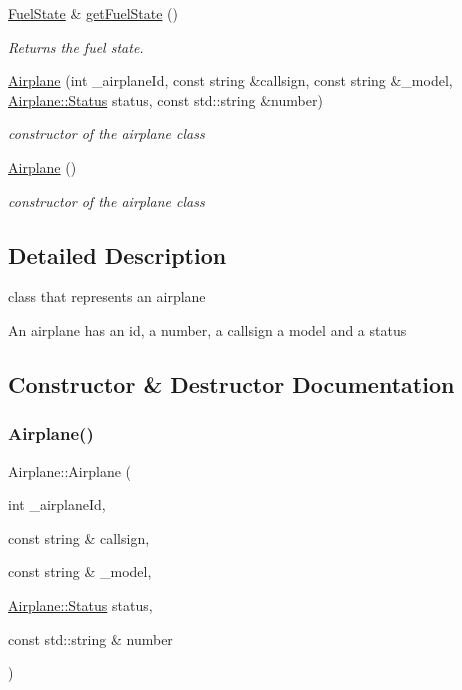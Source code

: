 \begin{DoxyCompactItemize}
\mbox{\hyperlink{class_airplane_ad17ce69f4dd39704789158c726f5bf45}{Fuel\+State}} \& \mbox{\hyperlink{class_airplane_a66070ab8430583b6abacec0bfe82a830}{get\+Fuel\+State}} ()
\begin{DoxyCompactList}\small\item\em Returns the fuel state. \end{DoxyCompactList}\item 
\mbox{\hyperlink{class_airplane_ad8ed968b4c3952fd8849414af207f45f}{Airplane}} (int \+\_\+airplane\+Id, const string \&callsign, const string \&\+\_\+model, \mbox{\hyperlink{class_airplane_a2fe18f372ef9acb9d557998a560ad66e}{Airplane\+::\+Status}} status, const std\+::string \&number)
\begin{DoxyCompactList}\small\item\em constructor of the airplane class \end{DoxyCompactList}\item 
\mbox{\hyperlink{class_airplane_afccae36e3013e038d51504cea1a98219}{Airplane}} ()
\begin{DoxyCompactList}\small\item\em constructor of the airplane class \end{DoxyCompactList}\end{DoxyCompactItemize}


\subsection{Detailed Description}
class that represents an airplane 

An airplane has an id, a number, a callsign a model and a status 

\subsection{Constructor \& Destructor Documentation}
\mbox{\label{class_airplane_ad8ed968b4c3952fd8849414af207f45f}} 
\subsubsection{\texorpdfstring{Airplane()}{Airplane()}\hspace{0.1cm}{\footnotesize\ttfamily [1/2]}}
{\footnotesize\ttfamily Airplane\+::\+Airplane (\begin{DoxyParamCaption}\item[{int}]{\+\_\+airplane\+Id,  }\item[{const string \&}]{callsign,  }\item[{const string \&}]{\+\_\+model,  }\item[{\mbox{\hyperlink{class_airplane_a2fe18f372ef9acb9d557998a560ad66e}{Airplane\+::\+Status}}}]{status,  }\item[{const std\+::string \&}]{number }\end{DoxyParamCaption})}



